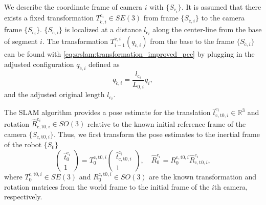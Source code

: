 We describe the coordinate frame of camera $i$ with $\{ S_{\mathrm{c}_i} \}$. It is assumed that there exists a fixed transformation $T_{\check{\mathrm{c}},i}^{\mathrm{c}_i} \in SE(3)$ from frame $\{ S_{\check{\mathrm{c}},i} \}$ to the camera frame $\{ S_{\mathrm{c}_i} \}$. 
$\{ S_{\check{\mathrm{c}},i} \}$ is localized at a distance $l_{\mathrm{c}_i}$ along the center-line from the base of segment $i$. 
The transformation $T_{i-1}^{\check{\mathrm{c}},i}(q_{\check{c},i})$ from the base to the frame $\{ S_{\check{\mathrm{c}},i} \}$ can be found with \eqref{eq:srslam:transformation_improved_pcc} by plugging in the adjusted configuration $q_{\check{c},i}$ defined as
\begin{equation}\label{eq:srslam:camera_configuration}
    q_{\check{c},i} = \frac{l_{\mathrm{c}_i}}{L_{0,i}} q_i,
\end{equation}
and the adjusted original length  $l_{\mathrm{c}_i}$.

The \gls{SLAM} algorithm provides a pose estimate for the translation $\hat{t}_{\mathrm{c},\mathrm{t}0,i}^{\mathrm{c}_i} \in \mathbb{R}^3$ and rotation $\hat{R}_{\mathrm{c},\mathrm{t}0,i}^{\mathrm{c}_i} \in SO(3)$ relative to the known initial reference frame of the camera $\{ S_{\mathrm{c},\mathrm{t}0,i} \}$. 
Thus, we first transform the pose estimates to the inertial frame of the robot $\{ S_0 \}$
\begin{equation}
    \begin{pmatrix}
        \hat{t}_{0}^{\mathrm{c}_i}\\
        1
    \end{pmatrix}
    = T_0^{\mathrm{c},\mathrm{t}0,i}
    \begin{pmatrix}
        \hat{t}_{\mathrm{c},\mathrm{t}0,i}^{\mathrm{c}_i}\\
        1
    \end{pmatrix},
    \quad
    \hat{R}_{0}^{\mathrm{c}_i} = R_0^{\mathrm{c},\mathrm{t}0,i} \hat{R}_{\mathrm{c},\mathrm{t}0,i}^{\mathrm{c}_i},
\end{equation}
where $T_0^{\mathrm{c},\mathrm{t}0,i} \in SE(3)$ and $R_0^{\mathrm{c},\mathrm{t}0,i} \in SO(3)$ are the known transformation and rotation matrices from the world frame to the initial frame of the $i$th camera, respectively.

